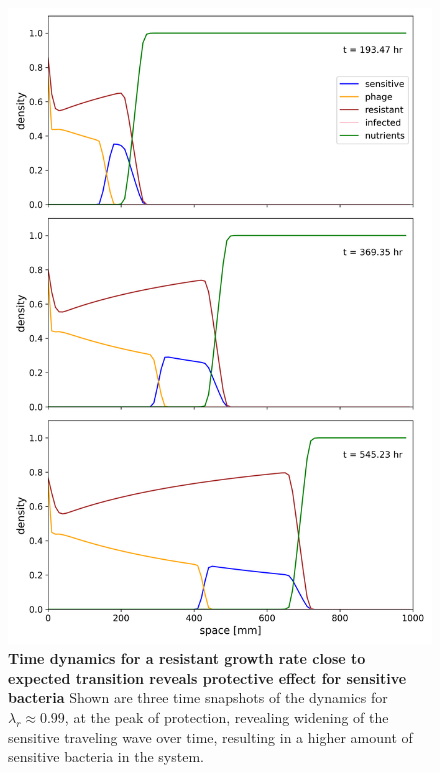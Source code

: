 \begin{figure}
\centering
\includegraphics[width=0.9\linewidth]{graphics/2025_09_30_phages_fig6.png}
\caption{\textbf{Time dynamics for a resistant growth rate close to expected transition reveals protective effect for sensitive bacteria} Shown are three time snapshots of the dynamics for $\lambda_r \approx 0.99$, at the peak of protection, revealing widening of the sensitive traveling wave over time, resulting in a higher amount of sensitive bacteria in the system.}
\label{fig:dynamics_peak}
\end{figure}

